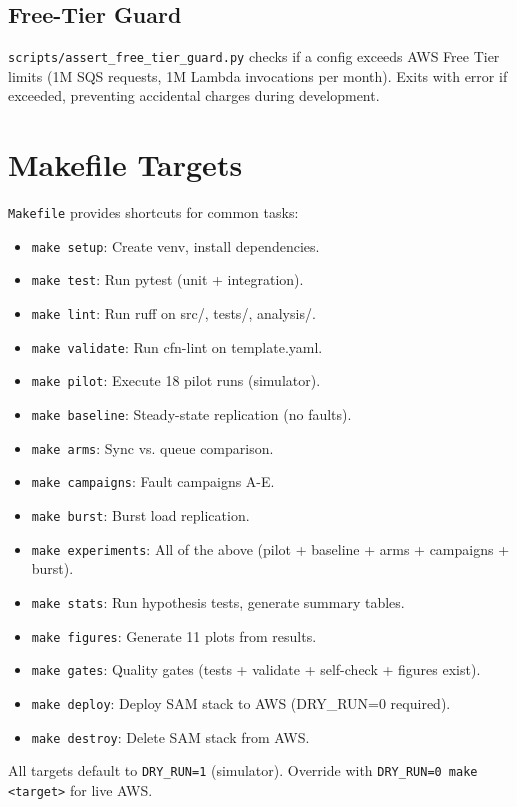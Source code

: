 \subsection{Free-Tier Guard}

\texttt{scripts/assert\_free\_tier\_guard.py} checks if a config exceeds AWS Free Tier limits (1M SQS requests, 1M Lambda invocations per month). Exits with error if exceeded, preventing accidental charges during development.

\section{Makefile Targets}

\texttt{Makefile} provides shortcuts for common tasks:
\begin{itemize}
    \item \texttt{make setup}: Create venv, install dependencies.
    \item \texttt{make test}: Run pytest (unit + integration).
    \item \texttt{make lint}: Run ruff on src/, tests/, analysis/.
    \item \texttt{make validate}: Run cfn-lint on template.yaml.
    \item \texttt{make pilot}: Execute 18 pilot runs (simulator).
    \item \texttt{make baseline}: Steady-state replication (no faults).
    \item \texttt{make arms}: Sync vs. queue comparison.
    \item \texttt{make campaigns}: Fault campaigns A-E.
    \item \texttt{make burst}: Burst load replication.
    \item \texttt{make experiments}: All of the above (pilot + baseline + arms + campaigns + burst).
    \item \texttt{make stats}: Run hypothesis tests, generate summary tables.
    \item \texttt{make figures}: Generate 11 plots from results.
    \item \texttt{make gates}: Quality gates (tests + validate + self-check + figures exist).
    \item \texttt{make deploy}: Deploy SAM stack to AWS (DRY\_RUN=0 required).
    \item \texttt{make destroy}: Delete SAM stack from AWS.
\end{itemize}

All targets default to \texttt{DRY\_RUN=1} (simulator). Override with \texttt{DRY\_RUN=0 make <target>} for live AWS.

